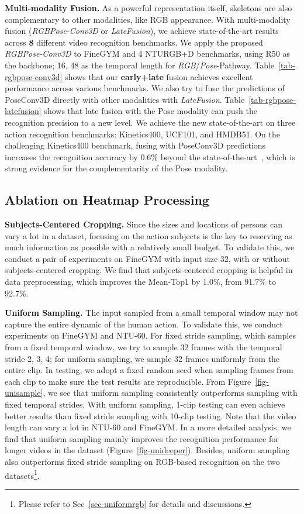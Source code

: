 \noindent
\textbf{Multi-modality Fusion. }
As a powerful representation itself, skeletons are also complementary to other modalities, like RGB appearance. 
With multi-modality fusion (\emph{RGBPose-Conv3D} or \emph{LateFusion}),
we achieve state-of-the-art results across \textbf{8} different video recognition benchmarks. 
We apply the proposed \emph{RGBPose-Conv3D} to FineGYM and 4 NTURGB+D benchmarks, 
using R50 as the backbone; 16, 48 as the temporal length for \emph{RGB}/\emph{Pose}-Pathway. 
Table~\ref{tab-rgbpose-conv3d} shows that our \textbf{early+late} fusion achieves excellent performance across various benchmarks.
We also try to fuse the predictions of PoseConv3D directly with other modalities with \emph{LateFusion}. 
Table~\ref{tab-rgbpose-latefusion} shows that late fusion with the Pose modality can push the recognition precision to a new level.
We achieve the new state-of-the-art on three action recognition benchmarks: Kinetics400, UCF101, and HMDB51.
On the challenging Kinetics400 benchmark, 
fusing with PoseConv3D predictions increases the recognition accuracy by 0.6\% beyond the state-of-the-art~\cite{liu2021video},
which is strong evidence for the complementarity of the Pose modality.



\subsection{Ablation on Heatmap Processing}

\noindent\textbf{Subjects-Centered Cropping. }
Since the sizes and locations of persons can vary a lot in a dataset, 
focusing on the action subjects is the key to reserving as much information as possible with a relatively small  budget.
To validate this, we conduct a pair of experiments on FineGYM with input size 32, with or without subjects-centered cropping.
We find that subjects-centered cropping is helpful in data preprocessing, which improves the Mean-Top1 by 1.0\%, from 91.7\% to 92.7\%.

\noindent
\textbf{Uniform Sampling. }
The input sampled from a small temporal window may not capture the entire dynamic of the human action. 
To validate this, we conduct experiments on FineGYM and NTU-60.
For fixed stride sampling, which samples from a fixed temporal window, we try to sample 32 frames with the temporal stride 2, 3, 4; 
for uniform sampling, we sample 32 frames uniformly from the entire clip.
In testing, we adopt a fixed random seed when sampling frames from each clip to make sure the test results are reproducible. 
From Figure~\ref{fig-unisample}, we see that uniform sampling consistently outperforms sampling with fixed temporal strides.
With uniform sampling, 1-clip testing can even achieve better results than fixed stride sampling with 10-clip testing.
Note that the video length can vary a lot in NTU-60 and FineGYM.
In a more detailed analysis, we find that uniform sampling mainly improves the recognition performance 
for longer videos in the dataset (Figure~\ref{fig-unideeper}).
Besides, uniform sampling also outperforms fixed stride sampling on RGB-based recognition on the two datasets\footnote{
	Please refer to Sec~\ref{sec-uniformrgb} for details and discussions. }.

